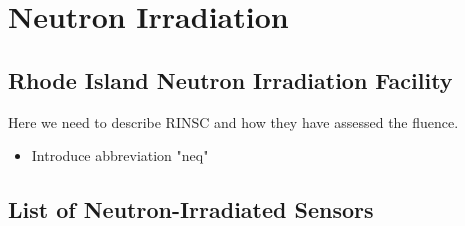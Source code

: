 \section{Neutron Irradiation}
\label{sec:irradiation}

\subsection{Rhode Island Neutron Irradiation Facility}
\label{subsec:RINSC}
Here we need to describe RINSC and how they have assessed the fluence.
\begin{itemize}
    \item Introduce abbreviation "neq"
\end{itemize}


\subsection{List of Neutron-Irradiated Sensors}
\label{subsec:sensors_irradiation}
